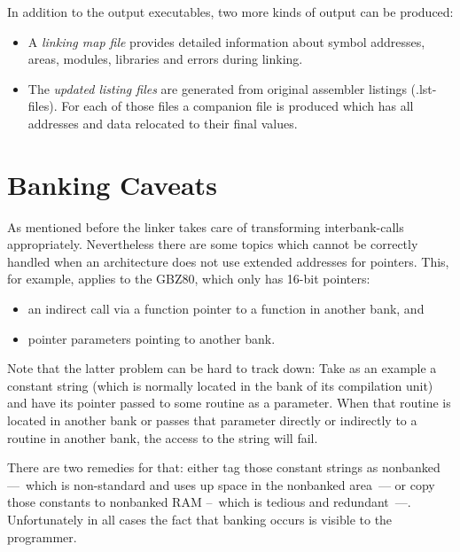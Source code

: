 \documentclass[10pt]{article}
\begin{document}
In addition to the output executables, two more kinds of output can be
produced:

\begin{itemize}
  \item A \emph{linking map file} provides detailed information about
        symbol addresses, areas, modules, libraries and errors during
        linking.

  \item The \emph{updated listing files} are generated from original
        assembler listings (.lst-files).  For each of those files a
        companion file is produced which has all addresses and data
        relocated to their final values.
\end{itemize}


\section{Banking Caveats}

As mentioned before the linker takes care of transforming
interbank-calls appropriately.  Nevertheless there are some topics
which cannot be correctly handled when an architecture does not use
extended addresses for pointers.  This, for example, applies to the
GBZ80, which only has 16-bit pointers:

\begin{itemize}
  \item an indirect call via a function pointer to a function in
        another bank, and

  \item pointer parameters pointing to another bank.
\end{itemize}

Note that the latter problem can be hard to track down: Take as an
example a constant string (which is normally located in the bank of
its compilation unit) and have its pointer passed to some routine as a
parameter.  When that routine is located in another bank or passes
that parameter directly or indirectly to a routine in another bank,
the access to the string will fail.

There are two remedies for that: either tag those constant strings as
nonbanked ---~which is non-standard and uses up space in the nonbanked
area~--- or copy those constants to nonbanked RAM --~which is tedious
and redundant~---.  Unfortunately in all cases the fact that banking
occurs is visible to the programmer.
\end{document}
